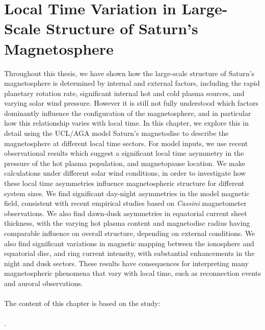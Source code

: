 \chapter{Local Time Variation in Large-Scale Structure of Saturn's Magnetosphere}
\label{chap:LTsectors}
Throughout this thesis, we have shown how the large-scale structure of Saturn's magnetosphere is determined by internal and external factors, including the rapid planetary rotation rate, significant internal hot and cold plasma sources, and varying solar wind pressure. However it is still not fully understood which factors dominantly influence the configuration of the magnetosphere, and in particular how this relationship varies with local time. In this chapter, we explore this in detail using the UCL/AGA model Saturn's magnetodisc to describe the magnetosphere at different local time sectors. For model inputs, we use recent observational results which suggest a significant local time asymmetry in the pressure of the hot plasma population, and magnetopause location. We make calculations under different solar wind conditions, in order to investigate how these local time asymmetries influence magnetospheric structure for different system sizes. We find significant day-night asymmetries in the model magnetic field, consistent with recent empirical studies based on \textit{Cassini} magnetometer observations. We also find dawn-dusk asymmetries in equatorial current sheet thickness, with the varying hot plasma content and magnetodisc radius having comparable influence on overall structure, depending on external conditions. We also find significant variations in magnetic mapping between the ionosphere and equatorial disc, and ring current intensity, with substantial enhancements in the night and dusk sectors. These results have consequences for interpreting many magnetospheric phenomena that vary with local time, such as reconnection events and auroral observations. \\
\\
The content of this chapter is based on the study: \\
\\
. 


